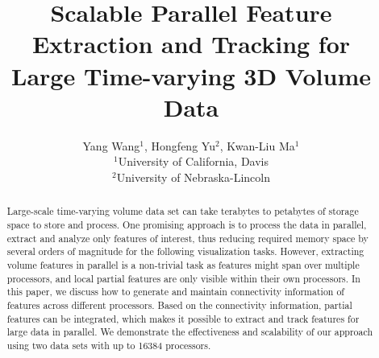 \documentclass{egpubl}
\title{ Scalable Parallel Feature Extraction and Tracking for \\
		Large Time-varying 3D Volume Data }
\author[Yang Wang, Hongfeng Yu, KwanLiu Ma]
       {Yang Wang$^{1}$, Hongfeng Yu$^{2}$, Kwan-Liu Ma$^{1}$ \\
         $^1$University of California, Davis \\
         $^2$University of Nebraska-Lincoln
       }
\begin{document}
\setlength{\parskip}{2mm plus 0.5mm minus 1.5mm}


\maketitle

\begin{abstract}
Large-scale time-varying volume data set can take terabytes to petabytes of storage space to store and process. 
One promising approach is to process the data in parallel, extract and analyze only features of interest, thus reducing required memory space by several orders of magnitude for the following visualization tasks. 
However, extracting volume features in parallel is a non-trivial task as features might span over multiple processors, and local partial features are only visible within their own processors. In this paper, we discuss how to generate and maintain connectivity information of features across different processors. Based on the connectivity information, partial features can be integrated, which makes it possible to extract and track features for large data in parallel. We demonstrate the effectiveness and scalability of our approach using two data sets with up to 16384 processors.
\begin{classification} %
\end{classification}
\end{abstract}









\end{document}
